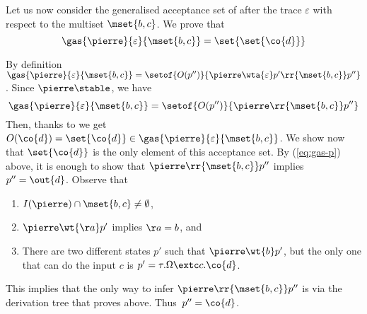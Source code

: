 Let us now consider the generalised acceptance set of \pierre after the
trace $\varepsilon$ with respect to the multiset $\mset{b, c}$.
We prove that
\begin{equation}
  \label{eq:pierre-gas}
  \gas{ \pierre }{ \varepsilon }{ \mset{b, c} } = \set{ \set{ \co{d} } }
\end{equation}

By definition 
  $\gas{ \pierre }{ \varepsilon }{ \mset{b, c} } =  \setof{ O(p'') }{
  \pierre \wta{ \varepsilon} p' \rr{\mset{b, c}} p'' }$. Since $
\pierre \stable$, we have
  \begin{equation}
    \label{eq:gas-p}
    \gas{ \pierre }{ \varepsilon }{ \mset{b, c} } =  \setof{ O(p'') }{ \pierre \rr{\mset{b, c}} p'' }
  \end{equation}
  Then, thanks to  %
  we get
  $
  O(\co{d}) = \set{ \co{d} } \in \gas{ \pierre }{ \varepsilon }{ \mset{b, c} }
  $.
  We show now that  $\set{ \co{d} }$ is the only element of this
  acceptance set.
By (\ref{eq:gas-p}) above, it is enough to show that
$\pierre \rr{\mset{b, c}} p''$ implies $p'' = \out{d} $.
Observe
that %
  \begin{enumerate}
  \item $ I( \pierre ) \cap \mset{ b,c } \neq \emptyset $,
  \item $ \pierre \wt{ \aa } p'$ implies $\aa = b$, and
  \item
    There are two different states $p'$ such that
   $ \pierre\wt{b}p'$, but 
    the only one that can do the input $c$ is $p' = \tau.\Omega \extc c.\co{d}$.
  \end{enumerate}
  This implies that the only way to infer
  $\pierre \rr{\mset{b, c}} p''$ is via the derivation tree
  that proves  above. Thus~$p'' = \co{d} $.


